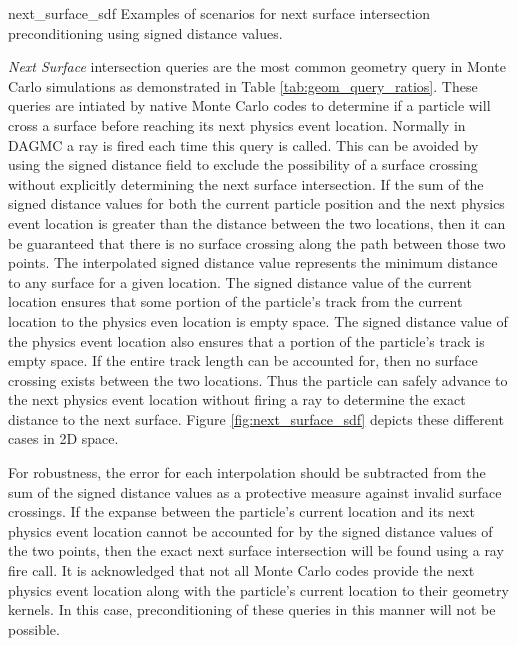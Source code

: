              {next_surface_sdf}
             {Examples of scenarios for next surface intersection preconditioning using signed distance values.}
             {
               \textit{Next Surface} intersection queries are the most common
               geometry query in Monte Carlo simulations as demonstrated in
               Table \ref{tab:geom_query_ratios}. These queries are intiated by
               native Monte Carlo codes to determine if a particle will cross a
               surface before reaching its next physics event location. Normally
               in DAGMC a ray is fired each time this query is called. This can
               be avoided by using the signed distance field to exclude the
               possibility of a surface crossing without explicitly determining
               the next surface intersection. If the sum of the signed distance
               values for both the current particle position and the next
               physics event location is greater than the distance between the
               two locations, then it can be guaranteed that there is no surface
               crossing along the path between those two points. The
               interpolated signed distance value represents the minimum
               distance to any surface for a given location. The signed distance
               value of the current location ensures that some portion of the
               particle's track from the current location to the physics even
               location is empty space. The signed distance value of the physics
               event location also ensures that a portion of the particle's
               track is empty space. If the entire track length can be accounted
               for, then no surface crossing exists between the two
               locations. Thus the particle can safely advance to the next
               physics event location without firing a ray to determine the
               exact distance to the next surface. Figure
               \ref{fig:next_surface_sdf} depicts these different cases in 2D
               space.
               
               For robustness, the error for each interpolation should be
               subtracted from the sum of the signed distance values as a
               protective measure against invalid surface crossings. If the
               expanse between the particle's current location and its next
               physics event location cannot be accounted for by the signed
               distance values of the two points, then the exact next surface
               intersection will be found using a ray fire
               call. It is acknowledged that not all
               Monte Carlo codes provide the next physics event location along
               with the particle's current location to their geometry
               kernels. In this case, preconditioning of these queries in this
               manner will not be possible.
              }

